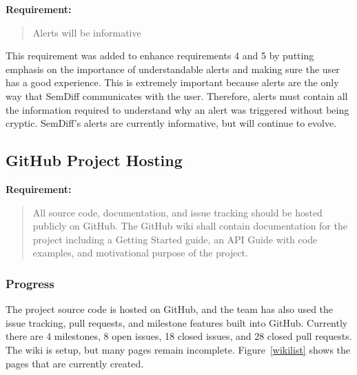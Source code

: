 \documentclass[draftclsnofoot,onecolumn]{IEEEtran}
\begin{document}
\textbf{Requirement:}

\begin{quote}

Alerts will be informative

\end{quote}

This requirement was added to enhance requirements 4 and 5 by putting 
emphasis on the importance of understandable alerts and making sure the user 
has a good experience. This is extremely important because alerts are the 
only way that SemDiff communicates with the user. Therefore, alerts must 
contain all the information required to understand why an alert was 
triggered without being cryptic. SemDiff’s alerts are currently informative, 
but will continue to evolve.







\subsection{GitHub Project Hosting}

\textbf{Requirement:}

\begin{quote}

All source code, documentation, and issue tracking should be hosted publicly 
on GitHub. The GitHub wiki shall contain documentation for the project 
including a Getting Started guide, an API Guide with code examples, and 
motivational purpose of the project.

\end{quote}

\subsubsection{Progress}

The project source code is hosted on GitHub, and the team has also used the 
issue tracking, pull requests, and milestone features built into GitHub. 
Currently there are 4 milestones, 8 open issues, 18 closed issues, and 28 
closed pull requests. The wiki is setup, but many pages remain incomplete. 
Figure~\ref{wikilist} shows the pages that are currently created.
\end{document}
